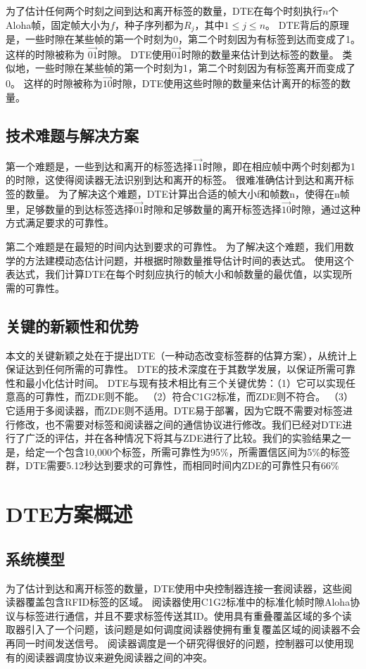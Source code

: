 \documentclass[UTF8]{ctexart}
\begin{document}
	为了估计任何两个时刻之间到达和离开标签的数量，DTE在每个时刻执行$n$个Aloha帧，固定帧大小为$f$，种子序列都为$R_j$，其中$1\leq j\leq n$。 DTE背后的原理是，一些时隙在某些帧的第一个时刻为0，第二个时刻因为有标签到达而变成了1。 这样的时隙被称为 $\overrightarrow{01}$时隙。 DTE使用$\overrightarrow{01}$时隙的数量来估计到达标签的数量。 类似地，一些时隙在某些帧的第一个时刻为1，第二个时刻因为有标签离开而变成了0。 这样的时隙被称为$\overrightarrow{10}$时隙，DTE使用这些时隙的数量来估计离开的标签的数量。
	
	\subsection{技术难题与解决方案}
	第一个难题是，一些到达和离开的标签选择$\overrightarrow{11}$时隙，即在相应帧中两个时刻都为1的时隙，这使得阅读器无法识别到达和离开的标签。 很难准确估计到达和离开标签的数量。 为了解决这个难题，DTE计算出合适的帧大小f和帧数n，使得在n帧里，足够数量的到达标签选择$\overrightarrow{01}$时隙和足够数量的离开标签选择$\overrightarrow{10}$时隙，通过这种方式满足要求的可靠性。
	
	第二个难题是在最短的时间内达到要求的可靠性。 为了解决这个难题，我们用数学的方法建模动态估计问题，并根据时隙数量推导估计时间的表达式。 使用这个表达式，我们计算DTE在每个时刻应执行的帧大小和帧数量的最优值，以实现所需的可靠性。
	
	\subsection{关键的新颖性和优势}
	本文的关键新颖之处在于提出DTE（一种动态改变标签群的估算方案），从统计上保证达到任何所需的可靠性。 DTE的技术深度在于其数学发展，以保证所需可靠性和最小化估计时间。 DTE与现有技术相比有三个关键优势：（1）它可以实现任意高的可靠性，而ZDE则不能。 （2）符合C1G2标准，而ZDE则不符合。 （3）它适用于多阅读器，而ZDE则不适用。DTE易于部署，因为它既不需要对标签进行修改，也不需要对标签和阅读器之间的通信协议进行修改。我们已经对DTE进行了广泛的评估，并在各种情况下将其与ZDE进行了比较。我们的实验结果之一是，给定一个包含10,000个标签，所需可靠性为95\%，所需置信区间为5\%的标签群，DTE需要5.12秒达到要求的可靠性，而相同时间内ZDE的可靠性只有66\%
	
	\section{DTE方案概述}
	\subsection{系统模型}
	为了估计到达和离开标签的数量，DTE使用中央控制器连接一套阅读器，这些阅读器覆盖包含RFID标签的区域。 阅读器使用C1G2标准中的标准化帧时隙Aloha协议与标签进行通信，并且不要求标签传送其ID。使用具有重叠覆盖区域的多个读取器引入了一个问题，该问题是如何调度阅读器使拥有重复覆盖区域的阅读器不会再同一时间发送信号。 阅读器调度是一个研究得很好的问题，控制器可以使用现有的阅读器调度协议来避免阅读器之间的冲突。
	
\end{document}
